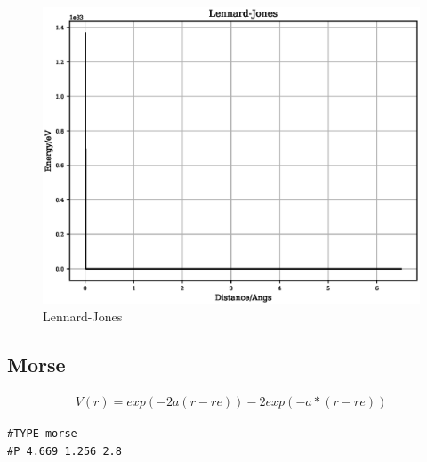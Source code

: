 \documentclass[12pt,twoside]{manual}
\begin{document}
\begin{appendices}
\FloatBarrier
\begin{figure}[h]
  \begin{center}
    \includegraphics[scale=0.5]{img/plots/lennard_jones.eps}
    \caption{Lennard-Jones}
    \label{graph:Lennard-Jones}
  \end{center}
\end{figure}
\FloatBarrier








\subsection{Morse}

\begin{equation}
\begin{split}
V(r) = exp(-2 a (r - re)) - 2 exp (-a*(r - re))
\end{split}
\label{eq:eqMorse}
\end{equation}

\begin{lstlisting}[style=pseudocode,caption={Morse}]
#TYPE morse
#P 4.669 1.256 2.8
\end{lstlisting}


\end{appendices}
\end{document}
